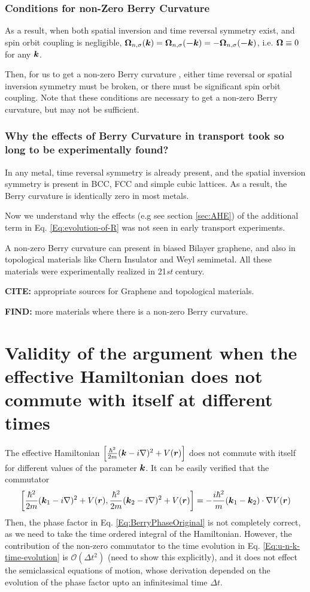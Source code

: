 \documentclass{report}
\renewcommand\vec[1]{\ensuremath\boldsymbol{#1}} %
\begin{document}
\subsection{Conditions for non-Zero Berry Curvature}
As a result, when both spatial inversion and time reversal symmetry exist, and spin orbit coupling is negligible, $\vec{\Omega}_{n,\sigma}(\vec{k}) = \vec{\Omega}_{n,\sigma}(\vec{-k}) = -\vec{\Omega}_{n,\sigma}(\vec{-k})$, i.e. $\vec{\Omega} \equiv 0$ for any $\vec{k}$.

Then, for us to get a non-zero Berry curvature \cite{ralph2020berry}, either time reversal or spatial inversion symmetry must be broken, or there must be significant spin orbit coupling. Note that these conditions are necessary to get a non-zero Berry curvature, but may not be sufficient.

\subsection{Why the effects of Berry Curvature in transport took so long to be experimentally found?}
 In any metal, time reversal symmetry is already present, and the spatial inversion symmetry is present in BCC, FCC and simple cubic lattices. As a result, the Berry curvature is identically zero in most metals.
 
 Now we understand why the effects (e.g see section \ref{sec:AHE}) of the additional term in Eq. \eqref{Eq:evolution-of-R} was not seen in early transport experiments.
 
 A non-zero Berry curvature can present in biased Bilayer graphene, and also in topological materials like Chern Insulator and Weyl semimetal. All these materials were experimentally realized in 21\textit{st} century.
 
 \textbf{CITE:} appropriate sources for Graphene and topological materials.
 
 \textbf{FIND:} more materials where there is a non-zero Berry curvature.
\chapter{Validity of the argument when the effective Hamiltonian does not commute with itself at different times}
The effective Hamiltonian $\left[\frac{\hbar^2}{2m}(\vec{k} - i \nabla)^2 + V(\vec{r}) \right]$ does not commute with itself for different values of the parameter $\vec{k}$. It can be easily verified that the commutator
$$
\left[\frac{\hbar^2}{2m}(\vec{k}_1 - i \nabla)^2 + V(\vec{r}), \frac{\hbar^2}{2m}(\vec{k}_2 - i \nabla)^2 + V(\vec{r}) \right] = -\frac{i \hbar^2}{m} (\vec{k}_1 - \vec{k}_2)\cdot\nabla V(\vec{r})
$$
 Then, the phase factor in Eq. \eqref{Eq:BerryPhaseOriginal} is not completely correct, as we need to take the time ordered integral of the Hamiltonian. However, the contribution of the non-zero commutator to the time evolution in Eq. \eqref{Eq:u-n-k-time-evolution} is $\mathcal{O} \left(\Delta{t}^2\right)$ (need to show this explicitly), and it does not effect the semiclassical equations of motion, whose derivation depended on the evolution of the phase factor upto an infinitesimal time $\Delta t$.
\end{document}
